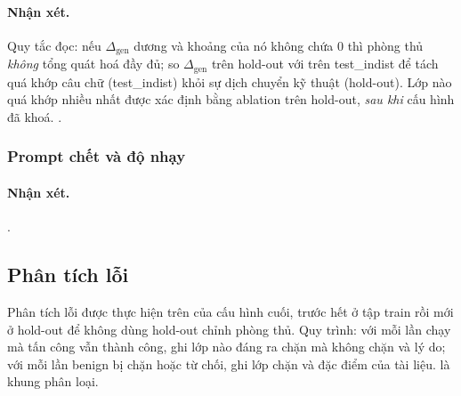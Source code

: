 \paragraph{Nhận xét.} Quy tắc đọc: nếu $\Delta_{\mathrm{gen}}$ dương và khoảng của nó không chứa 0 thì phòng thủ \emph{không} tổng quát hoá đầy đủ; so $\Delta_{\mathrm{gen}}$ trên hold-out với trên test\_indist để tách quá khớp câu chữ (test\_indist) khỏi sự dịch chuyển kỹ thuật (hold-out). Lớp nào quá khớp nhiều nhất được xác định bằng ablation trên hold-out, \emph{sau khi} cấu hình đã khoá. .

\subsubsection{Prompt chết và độ nhạy}\label{sec:res-dead}
\begin{table}[t]
\centering\small
\caption[Prompt chết và ASR hiệu dụng]{Prompt chết (ASR baseline bằng 0 trên mọi lần lấy mẫu) và ASR hiệu dụng tính trên phần còn sống.}\label{tab:dead}
\end{table}

\paragraph{Nhận xét.} .

\subsection{Phân tích lỗi}\label{sec:error}
Phân tích lỗi được thực hiện trên  của cấu hình cuối, trước hết ở tập train rồi mới ở hold-out để không dùng hold-out chỉnh phòng thủ. Quy trình: với mỗi lần chạy mà tấn công vẫn thành công, ghi lớp nào đáng ra chặn mà không chặn và lý do; với mỗi lần benign bị chặn hoặc từ chối, ghi lớp chặn và đặc điểm của tài liệu.  là khung phân loại.

